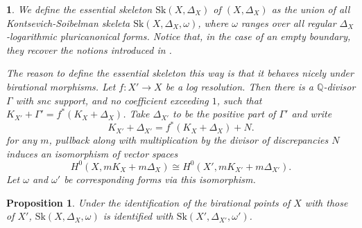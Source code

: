\documentclass{amsart}%
\numberwithin{equation}{subsection}
\theoremstyle{plain2}
\newtheorem{prop}[equation]{Proposition}
\theoremstyle{definition2}
\theoremstyle{stepstyle}
\theoremstyle{point}
\theoremstyle{subpoint}
\newtheorem{subpoint}[equation]{}%
\newcommand{\spa}[1]{\begin{subpoint}#1\end{subpoint}}           %
\newcommand{\Sk}{\mathrm{Sk}}
\begin{document}
\spa{We define the essential skeleton $\Sk(X,\Delta_X)$ of $(X,\Delta_X)$ as the union of all Kontsevich-Soibelman skeleta $\Sk(X, \Delta_X,\omega)$, where $\omega$ ranges over all regular $\Delta_X$-logarithmic pluricanonical forms. Notice that, in the case of an empty boundary, they recover the notions introduced in \cite{MustataNicaise}.

The reason to define the essential skeleton this way is that it behaves nicely under birational morphisms. Let $f \colon X'\to X$ be a log resolution. Then there is a $\mathbb{Q}$-divisor $\Gamma$ with snc support, and no coefficient exceeding $1$, such that $K_{X'}+\Gamma' = f^*(K_X+\Delta_X)$. Take $\Delta_{X'}$ to be the positive part of $\Gamma'$ and write $$K_{X'}+\Delta_{X'}= f^*(K_{X}+\Delta_X)+N.$$ for any $m$, pullback along with multiplication by the divisor of discrepancies $N$ induces an isomorphism of vector spaces \begin{equation} \label{equ isomo forms log resolution}
H^0(X, mK_{X}+m\Delta_X) \cong H^0(X', mK_{X'}+m\Delta_{X'}).
\end{equation} Let $\omega$ and $\omega'$ be corresponding forms via this isomorphism.}
\begin{prop} \label{prop birational invariance essential skeleton for pairs}
Under the identification of the birational points of $X$ with those of $X'$, $\Sk(X, \Delta_X,\omega)$ is identified with $\Sk(X', \Delta_{X'},\omega')$.
\end{prop}
\end{document}
